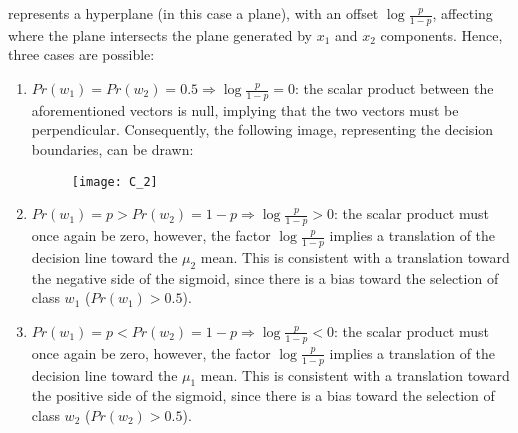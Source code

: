 represents a hyperplane (in this case a plane), with an offset
\(\log{\frac{p}{1-p}}\), affecting where the plane intersects the plane
generated by \(x_1\) and \(x_2\) components.
Hence, three cases are possible:
\begin{enumerate}
    \item \(Pr(w_1)=Pr(w_2)=0.5\Rightarrow\log{\frac{p}{1-p}}=0\):
    the scalar product between the aforementioned vectors is null, implying
    that the two vectors must be perpendicular. Consequently, the following
    image, representing the decision boundaries, can be drawn:
    \begin{figure}[H]
        \texttt{[image: C\_2]}
        \centering
    \end{figure}
    \item \(Pr(w_1)=p>Pr(w_2)=1-p\Rightarrow\log{\frac{p}{1-p}}>0\):
    the scalar product must once again be zero, however, the factor
    \(\log{\frac{p}{1-p}}\) implies a translation of the decision line
    toward the \(\mu_2\) mean. This is consistent with a translation
    toward the negative side of the sigmoid, since there is a bias
    toward the selection of class \(w_1\) (\(Pr(w_1)>0.5\)).
    \item \(Pr(w_1)=p<Pr(w_2)=1-p\Rightarrow\log{\frac{p}{1-p}}<0\):
    the scalar product must once again be zero, however, the factor
    \(\log{\frac{p}{1-p}}\) implies a translation of the decision line
    toward the \(\mu_1\) mean. This is consistent with a translation
    toward the positive side of the sigmoid, since there is a bias
    toward the selection of class \(w_2\) (\(Pr(w_2)>0.5\)).
  \end{enumerate}
